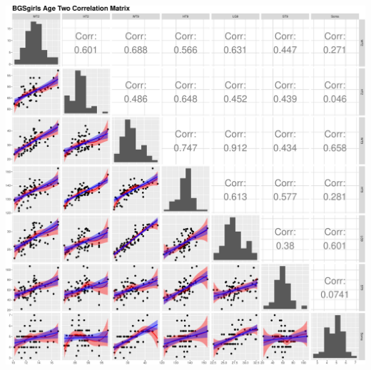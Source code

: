 \documentclass[]{article}
\begin{document}
\begin{center}\includegraphics{Assignment_2_files/figure-latex/fig2-1} \end{center}
\end{document}
